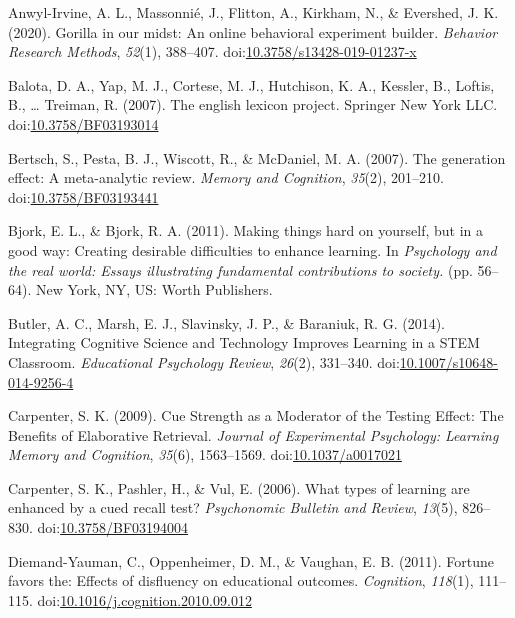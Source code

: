 \documentclass[jou]{apa6}
\begin{document}
\hypertarget{refs}{}
\leavevmode\hypertarget{ref-Anwyl-Irvine2020}{}%
Anwyl-Irvine, A. L., Massonnié, J., Flitton, A., Kirkham, N., \& Evershed, J. K. (2020). Gorilla in our midst: An online behavioral experiment builder. \emph{Behavior Research Methods}, \emph{52}(1), 388--407. doi:\href{https://doi.org/10.3758/s13428-019-01237-x}{10.3758/s13428-019-01237-x}

\leavevmode\hypertarget{ref-Balota2007}{}%
Balota, D. A., Yap, M. J., Cortese, M. J., Hutchison, K. A., Kessler, B., Loftis, B., \ldots{} Treiman, R. (2007). The english lexicon project. Springer New York LLC. doi:\href{https://doi.org/10.3758/BF03193014}{10.3758/BF03193014}

\leavevmode\hypertarget{ref-Bertsch2007}{}%
Bertsch, S., Pesta, B. J., Wiscott, R., \& McDaniel, M. A. (2007). The generation effect: A meta-analytic review. \emph{Memory and Cognition}, \emph{35}(2), 201--210. doi:\href{https://doi.org/10.3758/BF03193441}{10.3758/BF03193441}

\leavevmode\hypertarget{ref-Bjork2011}{}%
Bjork, E. L., \& Bjork, R. A. (2011). Making things hard on yourself, but in a good way: Creating desirable difficulties to enhance learning. In \emph{Psychology and the real world: Essays illustrating fundamental contributions to society.} (pp. 56--64). New York, NY, US: Worth Publishers.

\leavevmode\hypertarget{ref-Butler2014}{}%
Butler, A. C., Marsh, E. J., Slavinsky, J. P., \& Baraniuk, R. G. (2014). Integrating Cognitive Science and Technology Improves Learning in a STEM Classroom. \emph{Educational Psychology Review}, \emph{26}(2), 331--340. doi:\href{https://doi.org/10.1007/s10648-014-9256-4}{10.1007/s10648-014-9256-4}

\leavevmode\hypertarget{ref-Carpenter2009}{}%
Carpenter, S. K. (2009). Cue Strength as a Moderator of the Testing Effect: The Benefits of Elaborative Retrieval. \emph{Journal of Experimental Psychology: Learning Memory and Cognition}, \emph{35}(6), 1563--1569. doi:\href{https://doi.org/10.1037/a0017021}{10.1037/a0017021}

\leavevmode\hypertarget{ref-Carpenter2006}{}%
Carpenter, S. K., Pashler, H., \& Vul, E. (2006). What types of learning are enhanced by a cued recall test? \emph{Psychonomic Bulletin and Review}, \emph{13}(5), 826--830. doi:\href{https://doi.org/10.3758/BF03194004}{10.3758/BF03194004}

\leavevmode\hypertarget{ref-Diemand-Yauman2011}{}%
Diemand-Yauman, C., Oppenheimer, D. M., \& Vaughan, E. B. (2011). Fortune favors the: Effects of disfluency on educational outcomes. \emph{Cognition}, \emph{118}(1), 111--115. doi:\href{https://doi.org/10.1016/j.cognition.2010.09.012}{10.1016/j.cognition.2010.09.012}
\end{document}

